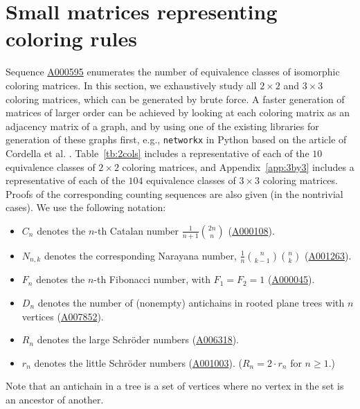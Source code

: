 \documentclass[12pt]{amsart}
\newcommand{\seqnum}[1]{\href{https://oeis.org/#1}{#1}}
\begin{document}
\section{Small matrices representing coloring rules}\label{sec:small}

Sequence \seqnum{A000595} enumerates the number of equivalence classes of isomorphic coloring matrices. In this section, we exhaustively study all $2\times 2$ and $3\times 3$ coloring matrices, which can be generated by brute force. A faster generation of matrices of larger order can be achieved by looking at each coloring matrix as an adjacency matrix of a graph, and by using one of the existing libraries for generation of these graphs first, e.g., \texttt{networkx} in Python based on the article of Cordella et al. \cite{cordella2001improved}. Table~\ref{tb:2cols} includes a representative of each of the $10$ equivalence classes of $2\times 2$ coloring matrices, and Appendix~\ref{app:3by3} includes a representative of each of the $104$ equivalence classes of $3\times 3$ coloring matrices. Proofs of the corresponding counting sequences are also given (in the nontrivial cases). We use the following notation: 
\begin{itemize}
    \item[] $C_{n}$ denotes the $n$-th Catalan number $\frac{1}{n+1}\binom{2n}{n}$ (\seqnum{A000108}).
    \item[] $N_{n,k}$ denotes the corresponding Narayana number, $\frac{1}{n}\binom{n}{k-1}\binom{n}{k}$ (\seqnum{A001263}).
    \item[] $F_{n}$ denotes the $n$-th Fibonacci number, with $F_{1}=F_{2}=1$ (\seqnum{A000045}).
    \item[] $D_{n}$ denotes the number of (nonempty) antichains in rooted plane trees with $n$ vertices (\seqnum{A007852}). 
    \item[] $R_{n}$ denotes the large Schr\"{o}der numbers (\seqnum{A006318}).
    \item[] $r_{n}$ denotes the little Schr\"{o}der numbers (\seqnum{A001003}).
    ($R_n=2\cdot r_n$ for $n\geq1$.)
\end{itemize}
Note that an antichain in a tree is a set of vertices where no vertex in the set is an ancestor of another.
\end{document}
